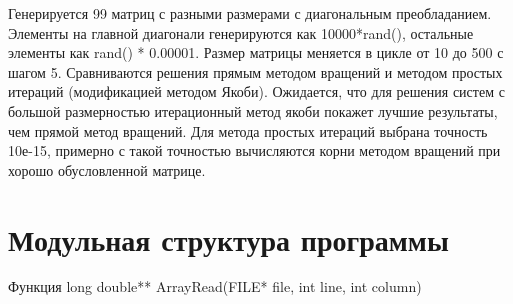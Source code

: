 Генерируется 99 матриц с разными размерами с диагональным преобладанием. Элементы на главной диагонали генерируются как 10000*rand(), остальные элементы как rand() * 0.00001. Размер матрицы меняется в цикле от 10 до 500 с шагом 5. Сравниваются решения прямым методом вращений и методом простых итераций (модификацией методом Якоби). Ожидается, что для решения систем с большой размерностью итерационный метод якоби покажет лучшие результаты, чем прямой метод вращений. Для метода простых итераций выбрана точность 10е-15, примерно с такой точностью вычисляются корни методом вращений при хорошо обусловленной матрице. 

\section{Модульная структура программы}

Функция long double** ArrayRead(FILE* file, int line, int column)


